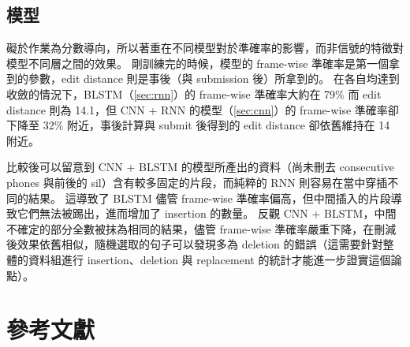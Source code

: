 \documentclass[final,3p]{elsarticle}
\begin{document}
	\subsection{模型}
		礙於作業為分數導向，所以著重在不同模型對於準確率的影響，而非信號的特徵對模型不同層之間的效果。
		剛訓練完的時候，模型的 frame-wise 準確率是第一個拿到的參數，edit distance 則是事後（與 submission 後）所拿到的。
		在各自均達到收斂的情況下，BLSTM（\cref{sec:rnn}）的 frame-wise 準確率大約在 79\% 而 edit distance 則為 14.1，但 CNN + RNN 的模型（\cref{sec:cnn}）的 frame-wise 準確率卻下降至 32\% 附近，事後計算與 submit 後得到的 edit distance 卻依舊維持在 14 附近。
		
		比較後可以留意到 CNN + BLSTM 的模型所產出的資料（尚未刪去 consecutive phones 與前後的 sil）含有較多固定的片段，而純粹的 RNN 則容易在當中穿插不同的結果。
		這導致了 BLSTM 儘管 frame-wise 準確率偏高，但中間插入的片段導致它們無法被踢出，進而增加了 insertion 的數量。
		反觀 CNN + BLSTM，中間不確定的部分全數被抹為相同的結果，儘管 frame-wise 準確率嚴重下降，在刪減後效果依舊相似，隨機選取的句子可以發現多為 deletion 的錯誤（這需要針對整體的資料組進行 insertion、deletion 與 replacement 的統計才能進一步證實這個論點）。
		


%  
% 
% 
% 
% 
% 
% 
% 
% 
% 
% 
% 
% 

\section{參考文獻}


	
\end{document}
